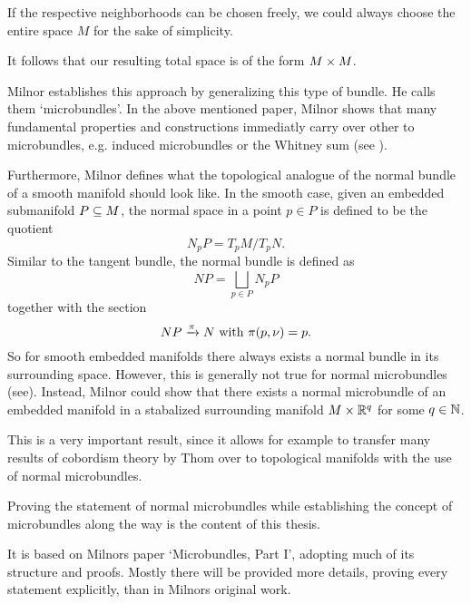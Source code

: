 \begin{myparagraph}
    If the respective neighborhoods can be chosen freely,
    we could always choose the entire space $M$ for the sake of simplicity.

    It follows that our resulting total space is of the form $M \times M$.
    
    Milnor establishes this approach by generalizing this type of bundle.
    He calls them `microbundles'.
    In the above mentioned paper, Milnor shows that many fundamental properties
    and constructions immediatly carry over other to microbundles,
    e.g. induced microbundles or the Whitney sum (see ).

    Furthermore, Milnor defines what the topological analogue
    of the normal bundle of a smooth manifold should look like.
    In the smooth case, given an embedded submanifold $P \subseteq{} M$,
    the normal space in a point $p \in P$
    is defined to be the quotient
    \[ N_p P = T_p M / T_p N. \]
    Similar to the tangent bundle, the normal bundle is defined as
    \[ NP  = \bigsqcup_{p \in P} N_p P \]
    together with the section
    \[ NP \xrightarrow{\pi} N \text{ with } \pi(p, \nu) = p. \]
    So for smooth embedded manifolds there always exists a normal bundle
    in its surrounding space.
    However, this is generally not true for normal microbundles (see\cite{rourke}).
    Instead, Milnor could show that there exists a normal microbundle of an embedded manifold
    in a stabalized surrounding manifold $M \times \mathbb{R}^q$ for some $q \in \mathbb{N}$. 

    This is a very important result, since it allows for example to transfer many results
    of cobordism theory by Thom over to topological manifolds
    with the use of normal microbundles.

    Proving the statement of normal microbundles while establishing the concept of
    microbundles along the way is the content of this thesis.

    It is based on Milnors paper `Microbundles, Part I',
    adopting much of its structure and proofs.
    Mostly there will be provided more details,
    proving every statement explicitly,
    than in Milnors original work.
\end{myparagraph}
